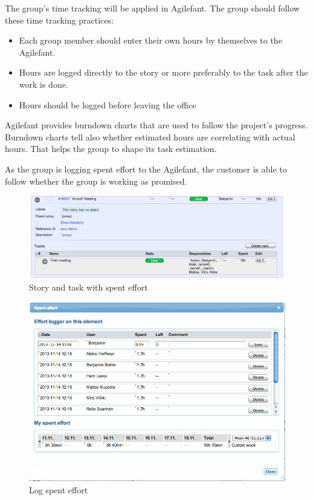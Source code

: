 The group's time tracking will be applied in Agilefant. The group should follow 
these time tracking practices:
\begin{itemize}
\item Each group member should enter their own hours by themselves to the 
Agilefant.
\item Hours are logged directly to the story or more preferably to the task 
after the work is done. 
\item Hours should be logged before leaving the office
\end{itemize}

Agilefant provides burndown charts that are used to follow the project's progress. Burndown charts tell also whether estimated hours are correlating with actual hours. That helps the group to shape its task estimation.

As the group is logging spent effort to the Agilefant, the customer is able to follow whether the group is working as promised. 

\begin{figure}[H]
\centering
\includegraphics[width=1\textwidth]{imgs/spenteffort1.png}
\caption{Story and task with spent effort}
\label{fig:spenteffort1}
\end{figure}


\begin{figure}[H]
\centering
\includegraphics[width=1\textwidth]{imgs/spenteffort2.png}
\caption{Log spent effort}
\label{fig:spenteffort2}
\end{figure}

